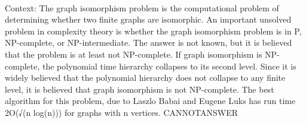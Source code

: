 \documentclass[11pt,a4paper, onecolumn]{article}
\begin{document}
\\ Context: The graph isomorphism problem is the computational problem of determining whether two finite graphs are isomorphic. An important unsolved problem in complexity theory is whether the graph isomorphism problem is in P, NP-complete, or NP-intermediate. The answer is not known, but it is believed that the problem is at least not NP-complete. If graph isomorphism is NP-complete, the polynomial time hierarchy collapses to its second level. Since it is widely believed that the polynomial hierarchy does not collapse to any finite level, it is believed that graph isomorphism is not NP-complete. The best algorithm for this problem, due to Laszlo Babai and Eugene Luks has run time 2O(√(n log(n))) for graphs with n vertices. CANNOTANSWER
\end{document}
